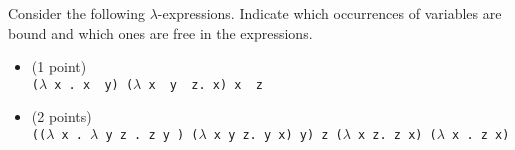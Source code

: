 \noindent
Consider the following $\lambda$-expressions. Indicate which occurrences of
variables are bound and which ones are free in the expressions.

\begin{itemize}
\item (1 point) \\ \texttt{($\lambda$ x .~x ~y) ($\lambda$ x ~y ~z.~x) x ~z}
\vspace{7cm}
\item (2 points) \\ \texttt{(($\lambda$ x .~$\lambda$ y z .~z~y ) ($\lambda$ x y z. y x) y) z ($\lambda$ x~z.~z x) ($\lambda$ x .~z x)}
\end{itemize}
